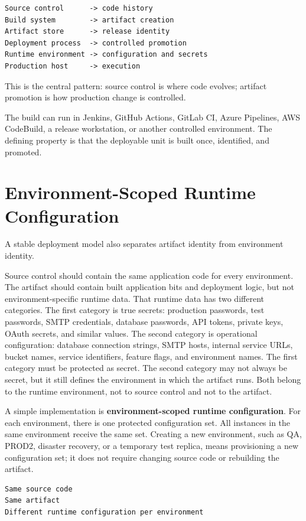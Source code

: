 \documentclass[11pt]{article}
\begin{document}
\begin{lstlisting}
Source control      -> code history
Build system        -> artifact creation
Artifact store      -> release identity
Deployment process  -> controlled promotion
Runtime environment -> configuration and secrets
Production host     -> execution
\end{lstlisting}

This is the central pattern: source control is where code evolves; artifact promotion is how production change is controlled.

The build can run in Jenkins, GitHub Actions, GitLab CI, Azure Pipelines, AWS CodeBuild, a release workstation, or another controlled environment. The defining property is that the deployable unit is built once, identified, and promoted.

\section{Environment-Scoped Runtime Configuration}

A stable deployment model also separates artifact identity from environment identity.

Source control should contain the same application code for every environment. The artifact should contain built application bits and deployment logic, but not environment-specific runtime data. That runtime data has two different categories. The first category is true secrets: production passwords, test passwords, SMTP credentials, database passwords, API tokens, private keys, OAuth secrets, and similar values. The second category is operational configuration: database connection strings, SMTP hosts, internal service URLs, bucket names, service identifiers, feature flags, and environment names. The first category must be protected as secret. The second category may not always be secret, but it still defines the environment in which the artifact runs. Both belong to the runtime environment, not to source control and not to the artifact.

A simple implementation is \textbf{environment-scoped runtime configuration}. For each environment, there is one protected configuration set. All instances in the same environment receive the same set. Creating a new environment, such as QA, PROD2, disaster recovery, or a temporary test replica, means provisioning a new configuration set; it does not require changing source code or rebuilding the artifact.

\begin{lstlisting}
Same source code
Same artifact
Different runtime configuration per environment
\end{lstlisting}
\end{document}
